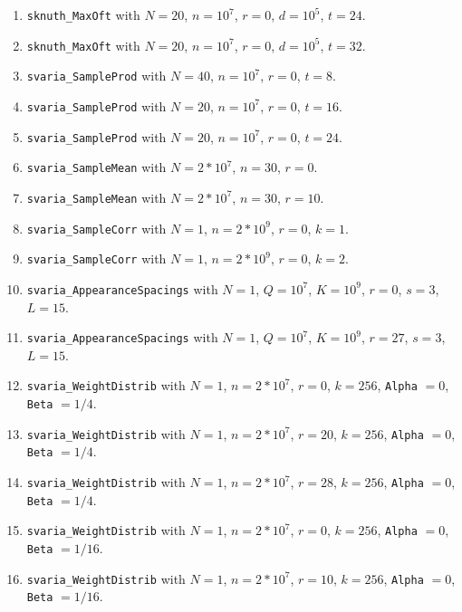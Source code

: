 \begin{enumerate}
  \item {\tt sknuth\_MaxOft} with $N=20$, $n=10^7$, $r=0$, $d=10^5$, $t=24$.

  \item {\tt sknuth\_MaxOft} with $N=20$, $n=10^7$, $r=0$, $d=10^5$, $t=32$.

  \item {\tt svaria\_SampleProd} with $N=40$, $n=10^7$, $r=0$, $t=8$.

  \item {\tt svaria\_SampleProd} with $N=20$, $n=10^7$, $r=0$, $t=16$.

  \item {\tt svaria\_SampleProd} with $N=20$, $n=10^7$, $r=0$, $t=24$.

  \item {\tt svaria\_SampleMean} with $N=2*10^7$, $n=30$, $r=0$.

  \item {\tt svaria\_SampleMean} with $N=2*10^7$, $n=30$, $r=10$.

  \item {\tt svaria\_SampleCorr} with $N=1$, $n=2*10^9$, $r=0$, $k=1$.

  \item {\tt svaria\_SampleCorr} with $N=1$, $n=2*10^9$, $r=0$, $k=2$.

  \item {\tt svaria\_AppearanceSpacings} with $N=1$,  $Q=10^7$, $K=10^9$,
   $r=0$,  $s=3$, $L=15$.

  \item {\tt svaria\_AppearanceSpacings} with $N=1$,  $Q=10^7$, $K=10^9$,
   $r=27$,  $s=3$, $L=15$.

  \item {\tt svaria\_WeightDistrib} with $N=1$, $n=2*10^7$, $r=0$, $k=256$,
   {\tt Alpha} $=0$,  {\tt Beta} $=1/4$.

  \item {\tt svaria\_WeightDistrib} with $N=1$, $n=2*10^7$, $r=20$, $k=256$,
   {\tt Alpha} $=0$,  {\tt Beta} $=1/4$.

  \item {\tt svaria\_WeightDistrib} with $N=1$, $n=2*10^7$, $r=28$, $k=256$,
   {\tt Alpha} $=0$,  {\tt Beta} $=1/4$.

  \item {\tt svaria\_WeightDistrib} with $N=1$, $n=2*10^7$, $r=0$, $k=256$,
   {\tt Alpha} $=0$,  {\tt Beta} $=1/16$.

  \item {\tt svaria\_WeightDistrib} with $N=1$, $n=2*10^7$, $r=10$, $k=256$,
   {\tt Alpha} $=0$,  {\tt Beta} $=1/16$.


\end{enumerate}

